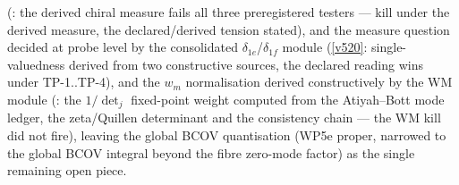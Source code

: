 \documentclass[11pt,a4paper]{article}
\begin{document}
(: the derived chiral measure fails all
three preregistered testers --- kill under the derived measure, the declared/derived tension
stated), and the measure question decided at probe level by the consolidated
$\delta_{1e}$/$\delta_{1f}$ module (\vref{v520}: single-valuedness derived from two
constructive sources, the declared reading wins under TP-1..TP-4), and the $w_m$
normalisation derived constructively by the WM module
(: the $1/\det_j$ fixed-point weight computed from
the Atiyah--Bott mode ledger, the zeta/Quillen determinant and the consistency chain --- the
WM kill did not fire), leaving the global
BCOV quantisation (WP5e proper, narrowed to the global BCOV integral beyond the fibre
zero-mode factor) as the single
remaining open piece.
\end{document}
